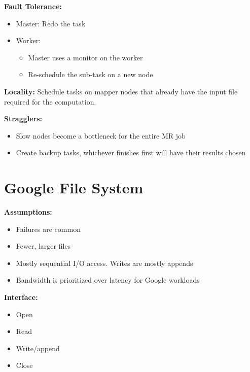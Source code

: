 \documentclass[parskip=half]{scrartcl}
\begin{document}
    \textbf{Fault Tolerance:}
    \begin{itemize}
        \item 
        Master: Redo the task
        \item 
        Worker:
        \begin{itemize}
            \item 
            Master uses a monitor on the worker
            \item 
            Re-schedule the sub-task on a new node
        \end{itemize}
    \end{itemize}

    \textbf{Locality:}
    Schedule tasks on mapper nodes that already have the input file required for the computation.

    \textbf{Stragglers:}
    \begin{itemize}
        \item 
        Slow nodes become a bottleneck for the entire MR job
        \item 
        Create backup tasks, whichever finishes first will have their results chosen
    \end{itemize}



\section{Google File System} %
\label{sec:google_file_system}

    \textbf{Assumptions:}
    \begin{itemize}
        \item 
        Failures are common
        \item 
        Fewer, larger files
        \item 
        Mostly sequential I/O access. Writes are mostly appends
        \item 
        Bandwidth is prioritized over latency for Google workloads
    \end{itemize}

    \textbf{Interface:}
    \begin{itemize}
        \item 
        Open
        \item 
        Read
        \item 
        Write/append
        \item 
        Close
    \end{itemize}
\end{document}
